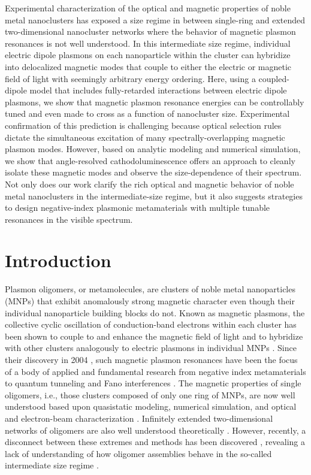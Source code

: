 \documentclass [11pt, proquest] {uwthesis}[2016/11/22]
\begin{document}
Experimental characterization of the optical and magnetic properties of noble metal nanoclusters has exposed a size regime in between single-ring and extended two-dimensional nanocluster networks where the behavior of magnetic plasmon resonances is not well understood. In this intermediate size regime, individual electric dipole plasmons on each nanoparticle within the cluster can hybridize into delocalized magnetic modes that couple to either the electric or magnetic field of light with seemingly arbitrary energy ordering. Here, using a coupled-dipole model that includes fully-retarded interactions between electric dipole plasmons, we show that magnetic plasmon resonance energies can be controllably tuned and even made to cross as a function of nanocluster size. Experimental confirmation of this prediction is challenging because optical selection rules dictate the simultaneous excitation of many spectrally-overlapping magnetic plasmon modes. However, based on analytic modeling and numerical simulation, we show that angle-resolved cathodoluminescence offers an approach to cleanly isolate these magnetic modes and observe the size-dependence of their spectrum. Not only does our work clarify the rich optical and magnetic behavior of noble metal nanoclusters in the intermediate-size regime, but it also suggests strategies to design negative-index plasmonic metamaterials with multiple tunable resonances in the visible spectrum.


\section{Introduction}
Plasmon oligomers, or metamolecules, are clusters of noble metal nanoparticles (MNPs) that exhibit anomalously strong magnetic character even though their individual nanoparticle building blocks do not. Known as magnetic plasmons, the collective cyclic oscillation of conduction-band electrons within each cluster has been shown to couple to and enhance the magnetic field of light and to hybridize with other clusters analogously to electric plasmons in individual MNPs \cite{Zhang2006,Zhang2007,NordHal2011,NordHal2012,Cherqui2014,Cherqui2016,Engheta2017}. Since their discovery in 2004 \cite{Shalaev2004}, such magnetic plasmon resonances have been the focus of a body of applied and fundamental research from negative index metamaterials\cite{Alu2006,Alu2008} to quantum tunneling \cite{Dionne2016} and Fano interferences \cite{Dionne2011,Liu2011,Cherqui2016}. The magnetic properties of single oligomers, i.e., those clusters composed of only one ring of MNPs, are now well understood based upon quasistatic modeling, numerical simulation, and optical and electron-beam characterization \cite{Prodan2003,Nord2006,Dionne2011,Dionne2016,Capolino2017}. Infinitely extended two-dimensional networks of oligomers are also well understood theoretically \cite{Schatz2003,Weick2013}. However, recently, a disconnect between these extremes and methods has been discovered \cite{Cherqui2014,Engheta2017}, revealing a lack of understanding of how oligomer assemblies behave in the so-called intermediate size regime \cite{NordHal2011,NordHal2012,Cherqui2014,Qian2015,Cherqui2016,Engheta2017,Fakhraai2018,Scherer2018}.
\end{document}

